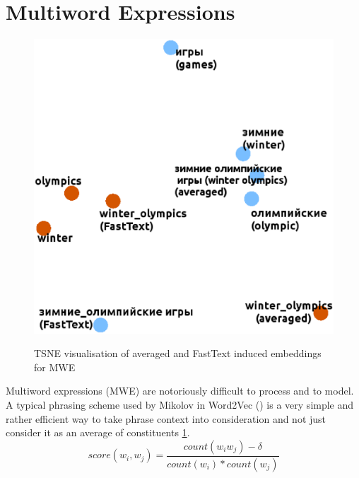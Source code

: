 \documentclass[11pt,a4paper]{article}
\begin{document}
\section{Multiword Expressions}
\begin{figure}
	
	\centering
	\small
	\includegraphics[scale=0.3]{mwe}\\
	
	\caption{TSNE visualisation of averaged and FastText induced embeddings for MWE}
	\label{mwe}
\end{figure}

Multiword expressions (MWE) are notoriously difficult to process and to model. A typical phrasing scheme used by Mikolov in Word2Vec (\citeyear{mikolov-representations-2013}) is a very simple	and rather efficient way to take phrase context into consideration and not just consider it as an average of constituents \ref{mwe}.
$$score(w_i, w_j) = \frac{count(w_iw_j) - \delta}{count(w_i) * count(w_j)}$$
\end{document}
